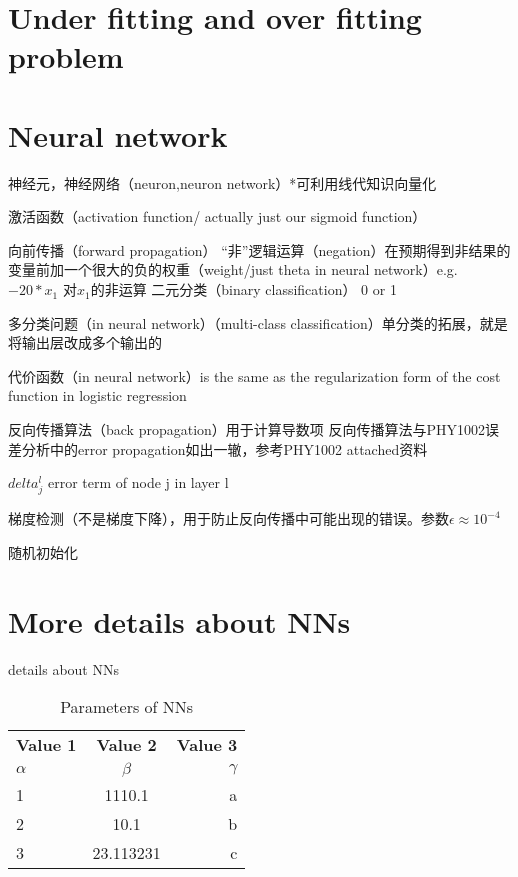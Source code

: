 \documentclass[10pt]{article}
\begin{document}
\section{Under fitting and over fitting problem}

\section{Neural network}

神经元，神经网络（neuron,neuron network）*可利用线代知识向量化

激活函数（activation function/ actually just our sigmoid function）

向前传播（forward propagation）
“非”逻辑运算（negation）在预期得到非结果的变量前加一个很大的负的权重（weight/just theta in neural network）e.g. $-20*x_1$ 对$x_1$的非运算
二元分类（binary classification） 0 or 1

多分类问题（in neural network）（multi-class classification）单分类的拓展，就是将输出层改成多个输出的

代价函数（in neural network）is the same as the regularization form of the cost function in logistic regression

反向传播算法（back propagation）用于计算导数项
反向传播算法与PHY1002误差分析中的error propagation如出一辙，参考PHY1002 attached资料

$delta^l_j$ error term of node j in layer l

梯度检测（不是梯度下降），用于防止反向传播中可能出现的错误。参数$\epsilon ≈ 10^{-4}$

随机初始化


\section{More details about NNs}
details about NNs

  \begin{table}[h!]
    \begin{center}
      \caption{Parameters of NNs}
      \label{tab:table1}
      \begin{tabular}{l|c|r} %
        \textbf{Value 1} & \textbf{Value 2} & \textbf{Value 3}\\
        $\alpha$ & $\beta$ & $\gamma$ \\
        \hline
        1 & 1110.1 & a\\
        2 & 10.1 & b\\
        3 & 23.113231 & c\\
      \end{tabular}
    \end{center}
  \end{table}
\end{document}
